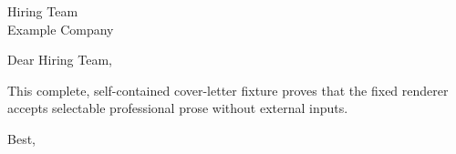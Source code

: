\documentclass[11pt]{letter}
\begin{document}
\begin{letter}{Hiring Team\\Example Company}
\opening{Dear Hiring Team,}
This complete, self-contained cover-letter fixture proves that the fixed renderer
accepts selectable professional prose without external inputs.
\closing{Best,}
\end{letter}
\end{document}
